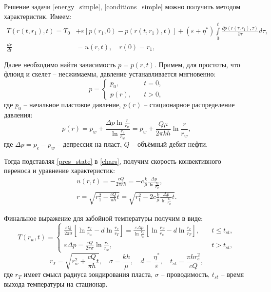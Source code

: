 	Решение задачи \eqref{energy_simple}, \eqref{conditions_simple} можно получить методом характеристик.
	Имеем:
\begin{align}
	\label{sol_simple}
	T(r(t, r_1), t) = T_0 &+ \varepsilon\left[p(r_1, 0)-p(r(t, r_1), t)\right]+
	(\varepsilon+\eta^{\ast})\int\limits_0^t \frac{\partial p(r(\tau, r_1), \tau)}{\partial \tau}d\tau,\\
	\label{chars}
	\frac{dr}{dt}&=u(r, t), \quad r(0)=r_1,
\end{align}

	Далее необходимо найти зависимость $p = p(r, t)$. Примем, для простоты, что флюид и скелет -- несжимаемы, давление устанавливается мнгновенно:
\begin{equation}
	\label{pres}
	p = 
	\begin{cases}
		p_0, &\quad t=0,\\
		p(r), &\quad t>0,
	\end{cases}
\end{equation}
	где $p_0$ -- начальное пластовое давление, $p(r)$ -- стационарное распределение давления:
\begin{equation}
	\label{pres_state}
	p(r) = p_w + \frac{\Delta p \ln\displaystyle\frac{r}{r_w}}{\ln\displaystyle\frac{r_e}{r_w}}
	 = p_w + \frac{Q\mu}{2\pi k h}\ln\frac{r}{r_w},
\end{equation}
	где $\Delta p = p_e - p_w$ -- депрессия на пласт, $Q$ -- объёмный дебит нефти.

	Тогда подставляя \eqref{pres_state} в \eqref{chars}, получим скорость конвективного переноса и уравнение характеристик:
\begin{align}
	\label{convection_speed}
	u(r, t) = -\frac{cQ}{2\pi r h} = -c\frac{k}{\mu}\frac{\Delta p}{\ln\displaystyle\frac{r_e}{r_w}},\\
	\label{chars_sol}
	r = \sqrt{r_1^2 - \displaystyle\frac{cQ}{\pi h}t} = \sqrt{r_1^2 - 2c\displaystyle\frac{k}{\mu}\frac{\Delta p}{\ln\displaystyle\frac{r_e}{r_w}}t}.
\end{align}

	Финальное выражение для забойной температуры получим в виде:
\begin{equation}
	\label{temperature}
		T(r_w, t) = 
	\begin{cases}
		\displaystyle\frac{\varepsilon Q}{2\pi \sigma}\left[\ln\displaystyle\frac{r_T}{r_w}-d\ln\displaystyle\frac{r_e}{r_T}\right] = \displaystyle\frac{\varepsilon \Delta p}{\ln \displaystyle\frac{r_e}{r_w}}\left[\ln\displaystyle\frac{r_T}{r_w}-d\ln\displaystyle\frac{r_e}{r_T}\right], &\quad t\leq t_{st} ,\\
		\varepsilon \Delta p =  \displaystyle\frac{\varepsilon Q}{2\pi\sigma}\ln\frac{r_e}{r_w}, &\quad t>t_{st},
	\end{cases}
\end{equation}
\begin{equation}
	\label{terms33}
	r_T = \sqrt{r_w^2 + \frac{cQ}{\pi h}t}, \quad
	\sigma = \frac{kh}{\mu}, \quad d = \frac{\eta^{\ast}}{\varepsilon}, \quad
	t_{st} = \frac{\pi h r_e^2}{cQ},
\end{equation}
	где $r_T$ имеет смысл радиуса зондирования пласта,
	$\sigma$ -- проводимость,
	$t_{st}$ -- время выхода температуры на стационар.

